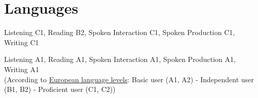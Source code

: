 \documentclass[10pt, a4paper]{article}
\begin{document}
	
	
	
	
	
	
	
	
	
	
	\section*{Languages}
	
	 Listening C1, Reading B2, Spoken Interaction C1, Spoken Production C1, Writing C1
	
	
	 Listening A1, Reading A1, Spoken Interaction A1, Spoken Production A1, Writing A1 \\
	
	\small (According to \href{https://europass.cedefop.europa.eu/resources/european-language-levels-cefr}{European language levels}: Basic user (A1, A2) - Independent user (B1, B2) - Proficient user (C1, C2))
	
\end{document}
